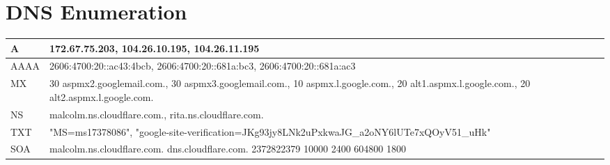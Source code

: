 
\section{DNS Enumeration}
\begin{tabularx}{\textwidth}{|l|X|}
\hline
A & 172.67.75.203, 104.26.10.195, 104.26.11.195 \\ \hline
AAAA & 2606:4700:20::ac43:4bcb, 2606:4700:20::681a:bc3, 2606:4700:20::681a:ac3 \\ \hline
MX & 30 aspmx2.googlemail.com., 30 aspmx3.googlemail.com., 10 aspmx.l.google.com., 20 alt1.aspmx.l.google.com., 20 alt2.aspmx.l.google.com. \\ \hline
NS & malcolm.ns.cloudflare.com., rita.ns.cloudflare.com. \\ \hline
TXT & "MS=ms17378086", "google-site-verification=JKg93jy8LNk2uPxkwaJG_a2oNY6lUTe7xQOyV51_uHk" \\ \hline
SOA & malcolm.ns.cloudflare.com. dns.cloudflare.com. 2372822379 10000 2400 604800 1800 \\ \hline
\end{tabularx}
